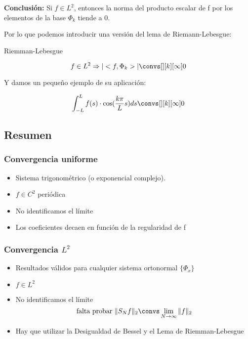 			{\bf Conclusión:}
			Si $f \in L^2$, entonces la norma del producto escalar de f por los elementos de la base $\Phi_k$ tiende a 0.

			Por lo que podemos introducir una versión del lema de Riemann-Lebesgue:

			\begin{lemma}{Riemman-Lebesgue}

				\[ f \in L^2 \Rightarrow |<f, \Phi_k>| \convs[ ][k][\infty] 0\]

			\end{lemma}

			Y damos un pequeño ejemplo de su aplicación:
			\begin{example}
				$$ \int_{-L}^{L} f(s) \cdot \cos(\frac{k\pi}{L}s) ds \convs[ ][k][\infty] 0$$
			\end{example}

	\subsection{Resumen}

		\subsubsection*{Convergencia uniforme}

			\begin{itemize}
				\item Sistema trigonométrico (o exponencial complejo).
				\item $f \in C^2$ periódica
				\item No identificamos el límite
				\item Los coeficientes decaen en función de la regularidad de f
			\end{itemize}

		\subsubsection*{Convergencia $L^2$}

			\begin{itemize}
				\item Resultados válidos para cualquier sistema ortonormal $\{ \Phi_x \}$
				\item $f \in L^2$
				\item No identificamos el límite
				\[\text{falta probar }\|S_N f\|_2 \convs \lim_{N \to \infty} \|f\|_2\]
				\item Hay que utilizar la Desigualdad de Bessel y el Lema de Riemman-Lebesgue

			\end{itemize}

